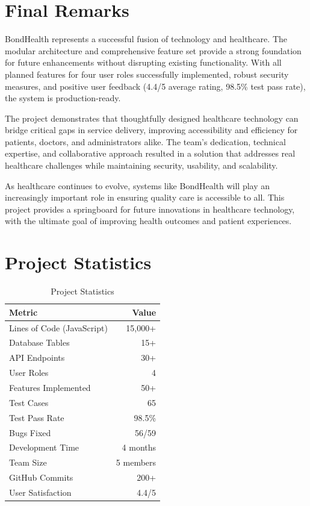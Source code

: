 \section{Final Remarks}

BondHealth represents a successful fusion of technology and healthcare. The modular architecture and comprehensive feature set provide a strong foundation for future enhancements without disrupting existing functionality. With all planned features for four user roles successfully implemented, robust security measures, and positive user feedback (4.4/5 average rating, 98.5\% test pass rate), the system is production-ready.

The project demonstrates that thoughtfully designed healthcare technology can bridge critical gaps in service delivery, improving accessibility and efficiency for patients, doctors, and administrators alike. The team's dedication, technical expertise, and collaborative approach resulted in a solution that addresses real healthcare challenges while maintaining security, usability, and scalability.

As healthcare continues to evolve, systems like BondHealth will play an increasingly important role in ensuring quality care is accessible to all. This project provides a springboard for future innovations in healthcare technology, with the ultimate goal of improving health outcomes and patient experiences.

\section{Project Statistics}

\begin{table}[H]
    \centering
    \small
    \begin{tabular}{|l|r|}
        \hline
        \textbf{Metric} & \textbf{Value} \\
        \hline
        Lines of Code (JavaScript) & 15,000+ \\
        \hline
        Database Tables & 15+ \\
        \hline
        API Endpoints & 30+ \\
        \hline
        User Roles & 4 \\
        \hline
        Features Implemented & 50+ \\
        \hline
        Test Cases & 65 \\
        \hline
        Test Pass Rate & 98.5\% \\
        \hline
        Bugs Fixed & 56/59 \\
        \hline
        Development Time & 4 months \\
        \hline
        Team Size & 5 members \\
        \hline
        GitHub Commits & 200+ \\
        \hline
        User Satisfaction & 4.4/5 \\
        \hline
    \end{tabular}
    \caption{Project Statistics}
    \label{tab:project-stats}
\end{table}
